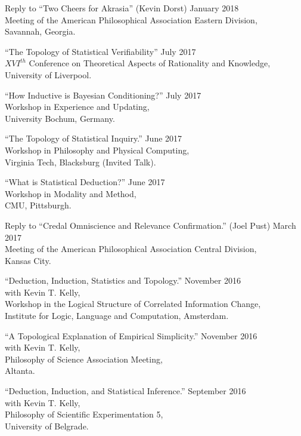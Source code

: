 \documentclass[12pt]{res} %
\begin{document}
\begin{resume}
Reply to ``Two Cheers for Akrasia'' (Kevin Dorst) \hfill January 2018\\
Meeting of the American Philosophical Association Eastern Division,\\ 
Savannah, Georgia.

``The Topology of Statistical Verifiability'' \hfill July 2017\\
$XVI^{th}$ Conference on Theoretical Aspects of Rationality and Knowledge,\\
University of Liverpool. 

``How Inductive is Bayesian Conditioning?'' \hfill July 2017\\
Workshop in Experience and Updating,\\
University Bochum, Germany.

``The Topology of Statistical Inquiry.'' \hfill June 2017\\
Workshop in Philosophy and Physical Computing, \\
Virginia Tech, Blacksburg (Invited Talk).

``What is Statistical Deduction?'' \hfill June 2017\\
Workshop in Modality and Method, \\
CMU, Pittsburgh.

Reply to ``Credal Omniscience and Relevance Confirmation.'' (Joel Pust) \hfill March 2017\\
Meeting of the American Philosophical Association Central Division,\\ 
Kansas City.

``Deduction, Induction, Statistics and Topology.'' \hfill November 2016\\
with Kevin T. Kelly,\\
 Workshop in the Logical Structure of Correlated Information Change,\\ Institute for Logic, Language and Computation, Amsterdam.

``A Topological Explanation of Empirical Simplicity.'' \hfill November 2016\\
with Kevin T. Kelly,\\
Philosophy of Science Association Meeting, \\
Altanta.

``Deduction, Induction, and Statistical Inference.'' \hfill September 2016\\
with Kevin T. Kelly,\\
Philosophy of Scientific Experimentation 5,\\
University of Belgrade.


\end{resume}
\end{document}
